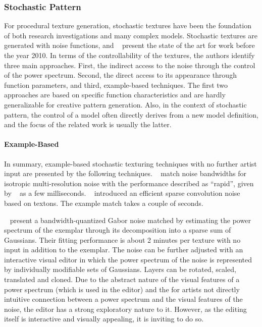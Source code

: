 \subsubsection{Stochastic Pattern}
\label{subsubsec:analysis_distribution_and_repetition_stochastic}

For procedural texture generation, stochastic textures have been the foundation of both research investigations and many complex models. Stochastic textures are generated with noise functions, and \citeauthor*{lagae_2010_sap}~\cite{lagae_2010_sap} present the state of the art for work before the year 2010. In terms of the controllability of the textures, the authors identify three main approaches. First, the indirect access to the noise through the control of the power spectrum. Second, the direct access to its appearance through function parameters, and 
third, example-based techniques. The first two approaches are based on specific function characteristics and are hardly generalizable for creative pattern generation. Also, in the context of stochastic pattern, the control of a model often directly derives from a new model definition, and the focus of the related work is usually the latter.


\paragraph*{Example-Based}
\label{para:analysis_stochastic_examplebased_control}

In summary, example-based stochastic texturing techniques with no further artist input are presented by the following techniques. \citeauthor*{lagae_2010_pis}~\cite{lagae_2010_pis} match noise bandwidths for isotropic multi-resolution noise with the performance described as ``rapid'', given by \citeauthor*{gilet_2012_mkn}~\cite{gilet_2012_mkn} as a few milliseconds. \citeauthor*{galerne_2017_tno}~\cite{galerne_2017_tno} introduced an efficient sparse convolution noise based on textons. The example match takes a couple of seconds.

\citeauthor*{galerne_2012_gne}~\cite{galerne_2012_gne} present a bandwidth-quantized Gabor noise matched by estimating the power spectrum of the exemplar through its decomposition into a sparse sum of Gaussians. Their fitting performance is about 2 minutes per texture with no input in addition to the exemplar. The noise can be further adjusted with an interactive visual editor in which the power spectrum of the noise is represented by individually modifiable sets of Gaussians. Layers can be rotated, scaled, translated and cloned. Due to the abstract nature of the visual features of a power spectrum (which is used in the editor) and the for artists not directly intuitive connection between a power spectrum and the visual features of the noise, the editor has a strong exploratory nature to it. However, as the editing itself is interactive and visually appealing, it is inviting to do so. 

